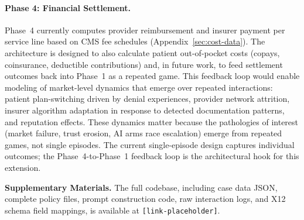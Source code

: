 \paragraph{Phase 4: Financial Settlement.}
Phase~4 currently computes provider reimbursement and insurer payment per service line based on CMS fee schedules (Appendix~\ref{sec:cost-data}). The architecture is designed to also calculate patient out-of-pocket costs (copays, coinsurance, deductible contributions) and, in future work, to feed settlement outcomes back into Phase~1 as a repeated game. This feedback loop would enable modeling of market-level dynamics that emerge over repeated interactions: patient plan-switching driven by denial experiences, provider network attrition, insurer algorithm adaptation in response to detected documentation patterns, and reputation effects. These dynamics matter because the pathologies of interest (market failure, trust erosion, AI arms race escalation) emerge from repeated games, not single episodes. The current single-episode design captures individual outcomes; the Phase~4-to-Phase~1 feedback loop is the architectural hook for this extension.

\bigskip
\noindent\textbf{Supplementary Materials.} The full codebase, including case data JSON, complete policy files, prompt construction code, raw interaction logs, and X12 schema field mappings, is available at \texttt{[link-placeholder]}.
